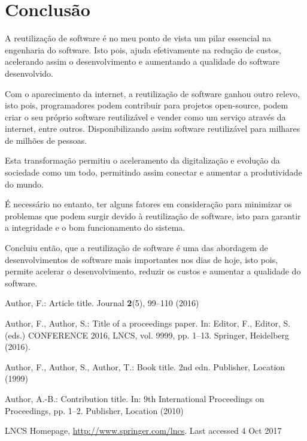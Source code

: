 \documentclass[runningheads]{llncs}
\begin{document}
\section{Conclusão}

A reutilização de software é no meu ponto de vista um pilar essencial na engenharia do software. Isto pois, ajuda efetivamente na redução de custos,  acelerando assim o desenvolvimento e aumentando a qualidade do software desenvolvido. \par
Com o aparecimento da internet, a reutilização de software ganhou outro relevo, isto pois, programadores podem contribuir para projetos open-source, podem criar o seu próprio software reutilizável e vender como um serviço através da internet, entre outros. Disponibilizando assim software reutilizável para milhares de milhões de pessoas.\par
Esta transformação permitiu o aceleramento da digitalização e evolução da sociedade como um todo, permitindo assim conectar e aumentar a produtividade do mundo.\par
É necessário no entanto, ter alguns fatores em consideração para minimizar os problemas que podem surgir devido à reutilização de software, isto para garantir a integridade e o bom funcionamento do sistema.\par
Concluiu então, que a reutilização de software é uma das abordagem de desenvolvimentos de software mais importantes nos dias de hoje, isto pois, permite acelerar o desenvolvimento, reduzir os custos e aumentar a qualidade do software.


%
%
%
% 
% 
%
\begin{thebibliography}{8}
    Author, F.: Article title. Journal \textbf{2}(5), 99--110 (2016)
    
    Author, F., Author, S.: Title of a proceedings paper. In: Editor,
    F., Editor, S. (eds.) CONFERENCE 2016, LNCS, vol. 9999, pp. 1--13.
    Springer, Heidelberg (2016). 
    
    Author, F., Author, S., Author, T.: Book title. 2nd edn. Publisher,
    Location (1999)
    
    Author, A.-B.: Contribution title. In: 9th International Proceedings
    on Proceedings, pp. 1--2. Publisher, Location (2010)
    
    LNCS Homepage, \url{http://www.springer.com/lncs}. Last accessed 4
    Oct 2017
    \end{thebibliography}
\end{document}
